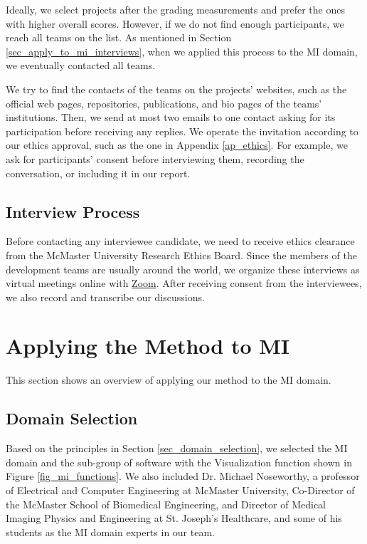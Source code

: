 Ideally, we select projects after the grading measurements and prefer the ones with higher overall scores. However, if we do not find enough participants, we reach all teams on the list. As mentioned in Section  \ref{sec_apply_to_mi_interviews}, when we applied this process to the MI domain, we eventually contacted all teams.

We try to find the contacts of the teams on the projects' websites, such as the official web pages, repositories, publications, and bio pages of the teams' institutions. Then, we send at most two emails to one contact asking for its participation before receiving any replies. We operate the invitation according to our ethics approval, such as the one in Appendix \ref{ap_ethics}. For example, we ask for participants' consent before interviewing them, recording the conversation, or including it in our report.

\subsection{Interview Process}
\label{sec_interview_process}
Before contacting any interviewee candidate, we need to receive ethics clearance from the McMaster University Research Ethics Board. Since the members of the development teams are usually around the world, we organize these interviews as virtual meetings online with \hyperlink{https://zoom.us/}{Zoom}. After receiving consent from the interviewees, we also record and transcribe our discussions.

\section{Applying the Method to MI}
\label{sec_applying_method}
This section shows an overview of applying our method to the MI domain.

\subsection{Domain Selection}
Based on the principles in Section \ref{sec_domain_selection}, we selected the MI domain and the sub-group of software with the Visualization function shown in Figure \ref{fig_mi_functions}. We also included Dr. Michael Noseworthy, a professor of Electrical and Computer Engineering at McMaster University, Co-Director of the McMaster School of Biomedical Engineering, and Director of Medical Imaging Physics and Engineering at St. Joseph’s Healthcare, and some of his students as the MI domain experts in our team.

